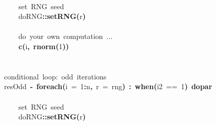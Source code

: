 \documentclass[a4paper,12pt]{article}\usepackage{graphicx, color}
\makeatletter
\newcommand{\hlnumber}[1]{\textcolor[rgb]{0,0,0}{#1}}%
\newcommand{\hlfunctioncall}[1]{\textcolor[rgb]{0.501960784313725,0,0.329411764705882}{\textbf{#1}}}%
\newcommand{\hlkeyword}[1]{\textcolor[rgb]{0,0,0}{\textbf{#1}}}%
\newcommand{\hlargument}[1]{\textcolor[rgb]{0.690196078431373,0.250980392156863,0.0196078431372549}{#1}}%
\newcommand{\hlcomment}[1]{\textcolor[rgb]{0.180392156862745,0.6,0.341176470588235}{#1}}%
\newcommand{\hlassignement}[1]{\textcolor[rgb]{0,0,0}{\textbf{#1}}}%
\newcommand{\hlpackage}[1]{\textcolor[rgb]{0.588235294117647,0.709803921568627,0.145098039215686}{#1}}%
\newcommand{\hlsymbol}[1]{\textcolor[rgb]{0,0,0}{#1}}%
\newcommand{\hlstd}[1]{\textcolor[rgb]{0,0,0}{#1}}%
\newenvironment{kframe}{%
 \def\FrameCommand##1{\hskip\@totalleftmargin \hskip-\fboxsep
 \colorbox{shadecolor}{##1}\hskip-\fboxsep
     \hskip-\linewidth \hskip-\@totalleftmargin \hskip\columnwidth}%
 \MakeFramed {\advance\hsize-\width
   \@totalleftmargin\z@ \linewidth\hsize
   \@setminipage}}%
 {\par\unskip\endMakeFramed}
\newenvironment{knitrout}{}{} %
\renewenvironment{knitrout}{\begin{footnotesize}}{\end{footnotesize}}
\makeatother
\begin{document}
\begin{knitrout}
\begin{kframe}
\begin{flushleft}
\hlstd{}\hspace*{\fill}\\
\hlstd{}{\ }{\ }{\ }{\ }\hlcomment{\usebox{\hlnormalsizeboxhash}{\ }set{\ }RNG{\ }seed}\hspace*{\fill}\\
\hlstd{}{\ }{\ }{\ }{\ }\hlpackage{doRNG}\hlkeyword{::}\hlfunctioncall{setRNG}\hlkeyword{(}\hlsymbol{r}\hlkeyword{)}\hspace*{\fill}\\
\hlstd{}\hspace*{\fill}\\
\hlstd{}{\ }{\ }{\ }{\ }\hlcomment{\usebox{\hlnormalsizeboxhash}{\ }do{\ }your{\ }own{\ }computation{\ }...}\hspace*{\fill}\\
\hlstd{}{\ }{\ }{\ }{\ }\hlfunctioncall{c}\hlkeyword{(}\hlsymbol{i}\hlkeyword{,}{\ }\hlfunctioncall{rnorm}\hlkeyword{(}\hlnumber{1}\hlkeyword{)}\hlkeyword{)}\hspace*{\fill}\\
\hlstd{}\hlkeyword{\usebox{\hlnormalsizeboxclosebrace}}\hspace*{\fill}\\
\hlstd{}\hspace*{\fill}\\
\hlstd{}\hlcomment{\usebox{\hlnormalsizeboxhash}{\ }conditional{\ }loop:{\ }odd{\ }iterations}\hspace*{\fill}\\
\hlstd{}\hlsymbol{resOdd}{\ }\hlassignement{\usebox{\hlnormalsizeboxlessthan}-}{\ }\hlfunctioncall{foreach}\hlkeyword{(}\hlargument{i}{\ }\hlargument{=}{\ }\hlnumber{1}\hlkeyword{:}\hlsymbol{n}\hlkeyword{,}{\ }\hlargument{r}{\ }\hlargument{=}{\ }\hlsymbol{rng}\hlkeyword{)}{\ }\hlkeyword{\usebox{\hlnormalsizeboxpercent}:\usebox{\hlnormalsizeboxpercent}}{\ }\hlfunctioncall{when}\hlkeyword{(}\hlsymbol{i}\hlkeyword{\usebox{\hlnormalsizeboxpercent}\usebox{\hlnormalsizeboxpercent}}\hlnumber{2}{\ }=={\ }\hlnumber{1}\hlkeyword{)}{\ }\hlkeyword{\usebox{\hlnormalsizeboxpercent}dopar\usebox{\hlnormalsizeboxpercent}}{\ }\hlkeyword{\usebox{\hlnormalsizeboxopenbrace}}\hspace*{\fill}\\
\hlstd{}\hspace*{\fill}\\
\hlstd{}{\ }{\ }{\ }{\ }\hlcomment{\usebox{\hlnormalsizeboxhash}{\ }set{\ }RNG{\ }seed}\hspace*{\fill}\\
\hlstd{}{\ }{\ }{\ }{\ }\hlpackage{doRNG}\hlkeyword{::}\hlfunctioncall{setRNG}\hlkeyword{(}\hlsymbol{r}\hlkeyword{)}\hspace*{\fill}\\

\end{flushleft}
\end{kframe}
\end{knitrout}
\end{document}
